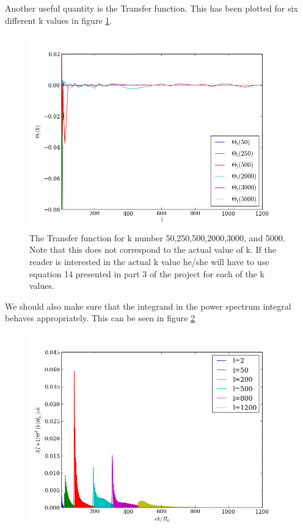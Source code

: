 \documentclass[a4paper]{report}
\begin{document}
Another useful quantity is the Transfer function. This has been plotted for six different k values in figure \ref{fig:transfer}.
\begin{figure}[ht]
 \includegraphics[width=\textwidth]{transfer.png}
 \caption{The Transfer function for k number 50,250,500,2000,3000, and 5000. Note that this does not correspond to the actual value of k. If the reader is interested in the actual k value he/she will have to use equation 14 presented in part 3 of the project for each of the k values. }
 \label{fig:transfer}
\end{figure}

We should also make sure that the integrand in the power spectrum integral behaves appropriately. This can be seen in figure \ref{fig:integ}
\begin{figure}[ht]
 \includegraphics[width=\textwidth]{integ.png}
 \caption{}
 \label{fig:integ}
\end{figure}
\end{document}

